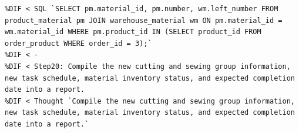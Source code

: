 \documentclass[preprint,12pt]{elsarticle}
\providecommand{\DIFmodbegin}{} %
\providecommand{\DIFmodend}{} %
\begin{document}
\DIFmodend %
\DIFmodbegin
\begin{lstlisting}[style=my_operation, label={lst:chain_of_operation},alsolanguage=DIFcode]
%DIF < Step19: Check material inventory for required materials
%DIF < SQL `SELECT pm.material_id, pm.number, wm.left_number FROM product_material pm JOIN warehouse_material wm ON pm.material_id = wm.material_id WHERE pm.product_id IN (SELECT product_id FROM order_product WHERE order_id = 3);`
%DIF < -
%DIF < Step20: Compile the new cutting and sewing group information, new task schedule, material inventory status, and expected completion date into a report.
%DIF < Thought `Compile the new cutting and sewing group information, new task schedule, material inventory status, and expected completion date into a report.`
\end{lstlisting}
\DIFmodend %
\end{document}
